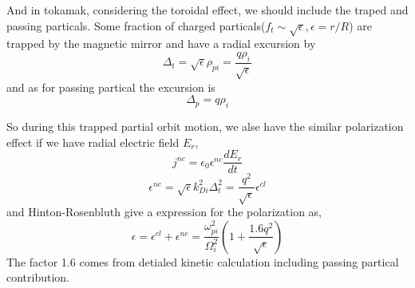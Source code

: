 \documentclass[11pt,a4paper]{article}
\begin{document}
	And in tokamak, considering the toroidal effect, we should include the traped and passing particals. Some fraction of charged particals($f_t\sim\sqrt{\epsilon},\epsilon=r/R$) are trapped by the magnetic mirror and have a radial excursion by 
	\begin{equation}
		\Delta_t=\sqrt{\epsilon}\rho_{pi}=\frac{q\rho_i}{\sqrt{\epsilon}}
	\end{equation}
	and as for passing partical the excursion is
	\begin{equation}
		\Delta_p=q\rho_i
	\end{equation}
	
	So during this trapped partial orbit motion, we alse have the similar polarization effect if we have radial electric field $E_r$, 
	\begin{equation}
		j^{nc}=\epsilon_0\epsilon^{nc}\frac{dE_r}{dt}
	\end{equation}
	\begin{equation}
		\epsilon^{nc}=\sqrt{\epsilon}k_{Di}^2\Delta_t^2=\frac{q^2}{\sqrt{\epsilon}}\epsilon^{cl}
	\end{equation}
	and Hinton-Rosenbluth give a expression for the polarization as,
	\begin{equation}
		\epsilon=\epsilon^{cl}+\epsilon^{nc}=\frac{\omega_{pi}^2}{\Omega_i^2}(1+\frac{1.6q^2}{\sqrt{\epsilon}})
	\end{equation}
	The factor 1.6 comes from detialed kinetic calculation including passing partical contribution.
	
\end{document}
